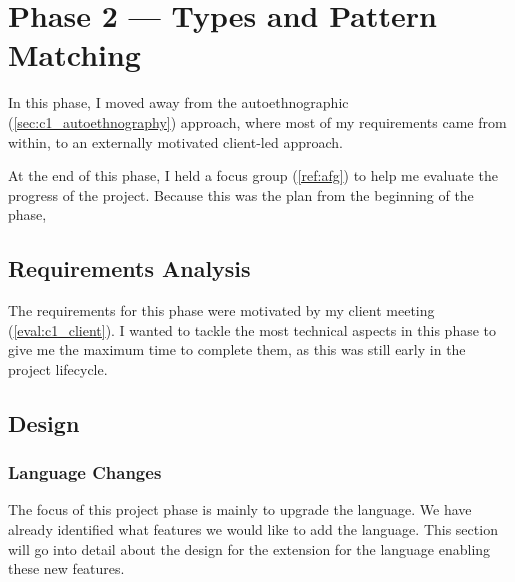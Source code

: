 \chapter{Phase 2 --- Types and Pattern Matching}
In this phase, I moved away from the autoethnographic (\ref{sec:c1_autoethnography}) approach, where most of my requirements came from within, to an externally motivated client-led approach. 


At the end of this phase, I held a focus group (\ref{ref:afg}) to help me evaluate the progress of the project. Because this was the plan from the beginning of the phase, 

\section{Requirements Analysis}
The requirements for this phase were motivated by my client meeting (\ref{eval:c1_client}). I wanted to tackle the most technical aspects in this phase to give me the maximum time to complete them, as this was still early in the project lifecycle. 


\section{Design}
\subsection{Language Changes}
The focus of this project phase is mainly to upgrade the language. We have already identified what features we would like to add the language. This section will go into detail about the design for the extension for the language enabling these new features. 
